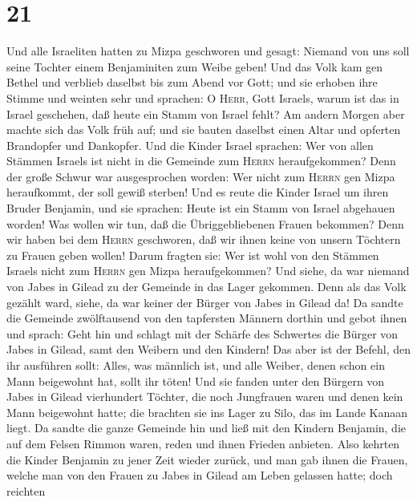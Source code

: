 \hypertarget{section-20}{%
\section{21}\label{section-20}}

 Und alle Israeliten hatten zu Mizpa geschworen und
gesagt: Niemand von uns soll seine Tochter einem Benjaminiten zum Weibe
geben!  Und das Volk kam gen Bethel und verblieb daselbst
bis zum Abend vor Gott; und sie erhoben ihre Stimme und weinten sehr
 und sprachen: O \textsc{Herr}, Gott Israels, warum ist
das in Israel geschehen, daß heute ein Stamm von Israel fehlt?
 Am andern Morgen aber machte sich das Volk früh auf; und
sie bauten daselbst einen Altar und opferten Brandopfer und Dankopfer.
 Und die Kinder Israel sprachen: Wer von allen Stämmen
Israels ist nicht in die Gemeinde zum \textsc{Herrn} heraufgekommen?
Denn der große Schwur war ausgesprochen worden: Wer nicht zum
\textsc{Herrn} gen Mizpa heraufkommt, der soll gewiß sterben!
 Und es reute die Kinder Israel um ihren Bruder Benjamin,
und sie sprachen: Heute ist ein Stamm von Israel abgehauen worden!
 Was wollen wir tun, daß die Übriggebliebenen Frauen
bekommen? Denn wir haben bei dem \textsc{Herrn} geschworen, daß wir
ihnen keine von unsern Töchtern zu Frauen geben wollen! 
Darum fragten sie: Wer ist wohl von den Stämmen Israels nicht zum
\textsc{Herrn} gen Mizpa heraufgekommen? Und siehe, da war niemand von
Jabes in Gilead zu der Gemeinde in das Lager gekommen. 
Denn als das Volk gezählt ward, siehe, da war keiner der Bürger von
Jabes in Gilead da!  Da sandte die Gemeinde zwölftausend
von den tapfersten Männern dorthin und gebot ihnen und sprach: Geht hin
und schlagt mit der Schärfe des Schwertes die Bürger von Jabes in
Gilead, samt den Weibern und den Kindern!  Das aber ist
der Befehl, den ihr ausführen sollt: Alles, was männlich ist, und alle
Weiber, denen schon ein Mann beigewohnt hat, sollt ihr töten!
 Und sie fanden unter den Bürgern von Jabes in Gilead
vierhundert Töchter, die noch Jungfrauen waren und denen kein Mann
beigewohnt hatte; die brachten sie ins Lager zu Silo, das im Lande
Kanaan liegt.  Da sandte die ganze Gemeinde hin und ließ
mit den Kindern Benjamin, die auf dem Felsen Rimmon waren, reden und
ihnen Frieden anbieten.  Also kehrten die Kinder Benjamin
zu jener Zeit wieder zurück, und man gab ihnen die Frauen, welche man
von den Frauen zu Jabes in Gilead am Leben gelassen hatte; doch reichten
